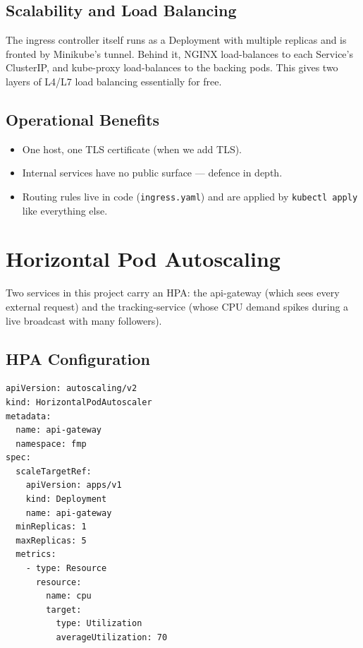 \documentclass[11pt,a4paper]{article}
\begin{document}
\subsection{Scalability and Load Balancing}
The ingress controller itself runs as a Deployment with multiple
replicas and is fronted by Minikube's tunnel.  Behind it, NGINX
load-balances to each Service's ClusterIP, and kube-proxy
load-balances to the backing pods.  This gives two layers of L4/L7
load balancing essentially for free.

\subsection{Operational Benefits}
\begin{itemize}[leftmargin=*]
  \item One host, one TLS certificate (when we add TLS).
  \item Internal services have no public surface — defence in depth.
  \item Routing rules live in code (\texttt{ingress.yaml}) and are
        applied by \texttt{kubectl apply} like everything else.
\end{itemize}

\section{Horizontal Pod Autoscaling}

Two services in this project carry an HPA: the api-gateway (which
sees every external request) and the tracking-service (whose CPU
demand spikes during a live broadcast with many followers).

\subsection{HPA Configuration}
\begin{lstlisting}[caption={api-gateway HPA.}]
apiVersion: autoscaling/v2
kind: HorizontalPodAutoscaler
metadata:
  name: api-gateway
  namespace: fmp
spec:
  scaleTargetRef:
    apiVersion: apps/v1
    kind: Deployment
    name: api-gateway
  minReplicas: 1
  maxReplicas: 5
  metrics:
    - type: Resource
      resource:
        name: cpu
        target:
          type: Utilization
          averageUtilization: 70
\end{lstlisting}
\end{document}
